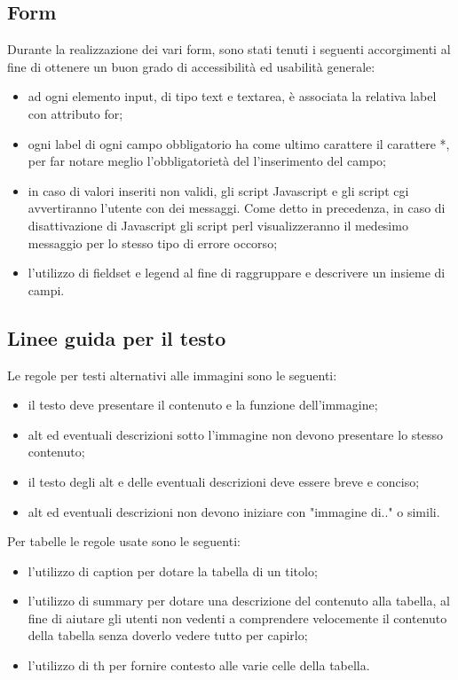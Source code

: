 \subsection{Form}
Durante la realizzazione dei vari form, sono stati tenuti i seguenti accorgimenti al fine di ottenere un buon grado di accessibilità ed usabilità generale:
\begin{itemize}
 \item ad ogni elemento input, di tipo text e textarea, è associata la relativa label con attributo for;
 \item ogni label di ogni campo obbligatorio ha come ultimo carattere il carattere *, per far notare meglio l'obbligatorietà del l'inserimento del campo;
 \item in caso di valori inseriti non validi, gli script Javascript e gli script cgi avvertiranno l'utente con dei messaggi. Come detto in precedenza, in caso di disattivazione di Javascript gli script perl visualizzeranno il medesimo messaggio per lo stesso tipo di errore occorso;
 \item l'utilizzo di fieldset e legend al fine di raggruppare e descrivere un insieme di campi.
\end{itemize}

\subsection{Linee guida per il testo}

Le regole per testi alternativi alle immagini sono le seguenti:
\begin{itemize}
 \item il testo deve presentare il contenuto e la funzione dell'immagine;
 \item alt ed eventuali descrizioni sotto l'immagine non devono presentare lo stesso contenuto;
 \item il testo degli alt e delle eventuali descrizioni deve essere breve e conciso;
 \item alt ed eventuali descrizioni non devono iniziare con "immagine di.." o simili.
\end{itemize}

Per tabelle le regole usate sono le seguenti:
\begin{itemize}
 \item l'utilizzo di caption per dotare la tabella di un titolo;
 \item l'utilizzo di summary per dotare una descrizione del contenuto alla tabella, al fine di aiutare gli utenti non vedenti a comprendere velocemente il contenuto della tabella senza doverlo vedere tutto per capirlo;
 \item l'utilizzo di th per fornire contesto alle varie celle della tabella.
\end{itemize}

